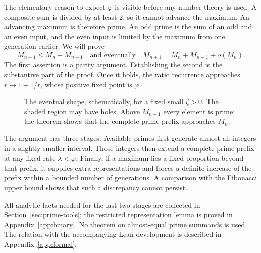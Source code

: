 \documentclass[11pt,letterpaper]{article}
\numberwithin{equation}{section}
\theoremstyle{definition}
\theoremstyle{remark}
\newcommand{\ph}{\varphi}
\begin{document}
The elementary reason to expect $\ph$ is visible before any number theory
is used. A composite sum is divided by at least $2$, so it cannot advance
the maximum. An advancing maximum is therefore prime. An odd prime is
the sum of an odd and an even input, and the even input is limited by
the maximum from one generation earlier. We will prove
\[
 M_{n+1}\le M_n+M_{n-1}
 \quad\text{and eventually}\quad
 M_{n+1}=M_n+M_{n-1}+o(M_n).
\]
The first assertion is a parity argument. Establishing the second is the
substantive part of the proof. Once it holds, the ratio recurrence approaches
$r\mapsto1+1/r$, whose positive fixed point is $\ph$.

\begin{figure}[htbp]
\centering
{}
\caption{The eventual shape, schematically, for a fixed small $\zeta>0$.
The shaded region may have holes. Above $M_{n-1}$ every element is prime;
the theorem shows that the complete prime prefix approaches $M_n$.}
\label{fig:shape}
\end{figure}

The argument has three stages. Available primes first generate almost all
integers in a slightly smaller interval. Those integers then extend a
complete prime prefix at any fixed rate $\lambda<\ph$. Finally, if a
maximum lies a fixed proportion beyond that prefix, it supplies extra
representations and forces a definite increase of the prefix within a
bounded number of generations. A comparison with the Fibonacci upper
bound shows that such a discrepancy cannot persist.

All analytic facts needed for the last two stages are collected in
Section~\ref{sec:prime-tools}; the restricted representation lemma is
proved in Appendix~\ref{app:binary}. No theorem on almost-equal prime
summands is used. The relation with the accompanying Lean development is
described in Appendix~\ref{app:formal}.
\end{document}
